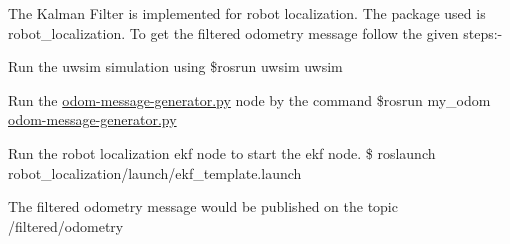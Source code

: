 The Kalman Filter is implemented for robot localization. The package used is robot\+\_\+localization. To get the filtered odometry message follow the given steps\+:-\/


\begin{DoxyEnumerate}
\item Run the uwsim simulation using \$rosrun uwsim uwsim
\item Run the \mbox{\hyperlink{odom-message-generator_8py_source}{odom-\/message-\/generator.\+py}} node by the command \$rosrun my\+\_\+odom \mbox{\hyperlink{odom-message-generator_8py_source}{odom-\/message-\/generator.\+py}}
\item Run the robot localization ekf node to start the ekf node. \$ roslaunch robot\+\_\+localization/launch/ekf\+\_\+template.\+launch
\end{DoxyEnumerate}

The filtered odometry message would be published on the topic /filtered/odometry 